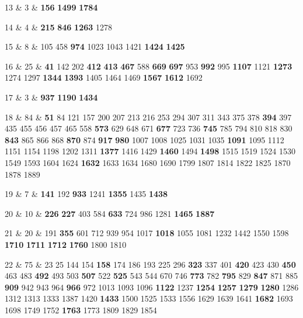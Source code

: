 13 & 3 & \textbf{156} \textbf{1499} \textbf{1784} \\  

14 & 4 & \textbf{215} \textbf{846} \textbf{1263} 1278 \\  

15 & 8 & 105 458 \textbf{974} 1023 1043 1421 \textbf{1424} \textbf{1425} \\  

16 & 25 & \textbf{41} 142 202 \textbf{412} \textbf{413} \textbf{467} 588 \textbf{669} \textbf{697} 953 \textbf{992} 995 \textbf{1107} 1121 \textbf{1273} 1274 1297 \textbf{1344} \textbf{1393} 1405 1464 1469 \textbf{1567} \textbf{1612} 1692 \\  

17 & 3 & \textbf{937} \textbf{1190} \textbf{1434} \\  

18 & 84 & \textbf{51} 84 121 157 200 207 213 216 253 294 307 311 343 375 378 \textbf{394} 397 435 455 456 457 465 558 \textbf{573} 629 648 671 \textbf{677} 723 736 \textbf{745} 785 794 810 818 830 \textbf{843} 865 866 868 \textbf{870} 874 \textbf{917} \textbf{980} 1007 1008 1025 1031 1035 \textbf{1091} 1095 1112 1151 1154 1198 1202 1311 \textbf{1377} 1416 1429 \textbf{1460} 1494 \textbf{1498} 1515 1519 1524 1530 1549 1593 1604 1624 \textbf{1632} 1633 1634 1680 1690 1799 1807 1814 1822 1825 1870 1878 1889 \\  

19 & 7 & \textbf{141} 192 \textbf{933} 1241 \textbf{1355} 1435 \textbf{1438} \\  

20 & 10 & \textbf{226} \textbf{227} 403 584 \textbf{633} 724 986 1281 \textbf{1465} \textbf{1887} \\  

21 & 20 & 191 \textbf{355} 601 712 939 954 1017 \textbf{1018} 1055 1081 1232 1442 1550 1598 \textbf{1710} \textbf{1711} \textbf{1712} \textbf{1760} 1800 1810 \\  

22 & 75 & 23 25 144 154 \textbf{158} 174 186 193 225 296 \textbf{323} 337 401 \textbf{420} 423 430 \textbf{450} 463 483 \textbf{492} 493 503 \textbf{507} 522 \textbf{525} 543 544 670 746 \textbf{773} 782 \textbf{795} 829 \textbf{847} 871 885 \textbf{909} 942 943 964 \textbf{966} 972 1013 1093 1096 \textbf{1122} 1237 \textbf{1254} \textbf{1257} \textbf{1279} \textbf{1280} 1286 1312 1313 1333 1387 1420 \textbf{1433} 1500 1525 1533 1556 1629 1639 1641 \textbf{1682} 1693 1698 1749 1752 \textbf{1763} 1773 1809 1829 1854 \\  


